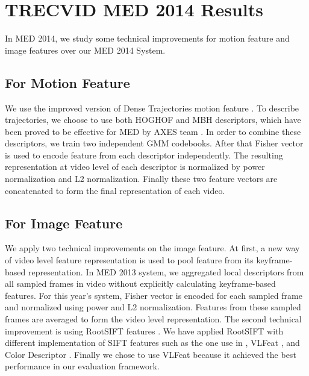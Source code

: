 
\chapter{TRECVID MED 2014 Results}

\ifpdf
\graphicspath{{Appendix2/Figs/Raster/}{Appendix2/Figs/PDF/}{Appendix2/Figs/}}
\else
\graphicspath{{Appendix2/Figs/Vector/}{Appendix2/Figs/}}
\fi

In MED 2014, we study some technical improvements for motion feature and image features over our MED 2014 System.

\section{For Motion Feature}
We use the improved version of Dense Trajectories motion feature \cite{wang2013action}. To describe trajectories, we choose to use both HOGHOF and MBH descriptors, which have been proved to be effective for MED by AXES team \cite{aly2013axes}. In order to combine these descriptors, we train two independent GMM codebooks. After that Fisher vector is used to encode feature from each descriptor independently. The resulting representation at video level of each descriptor is normalized by power normalization and L2 normalization. Finally these two feature vectors are concatenated to form the final representation of each video.

\section{For Image Feature}
We apply two technical improvements on the image feature. At first, a new way of video level feature representation is used to pool feature from its keyframe-based representation. In MED 2013 system, we aggregated local descriptors from all sampled frames in video without explicitly calculating keyframe-based features. For this year's system, Fisher vector is encoded for each sampled frame and normalized using power and L2 normalization. Features from these sampled frames are averaged to form the video level representation. The second technical improvement is using RootSIFT features \cite{arandjelovic2012three}. We have applied RootSIFT with different implementation of SIFT features such as the one use in \cite{mikolajczyk2005performance}, VLFeat \cite{vedaldi08vlfeat}, and Color Descriptor \cite{vandeSandeTPAMI2010}. Finally we chose to use VLFeat because it achieved the best performance in our evaluation framework.

